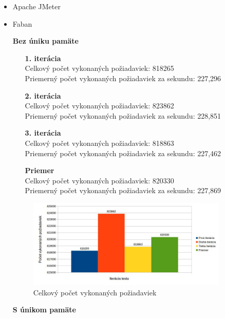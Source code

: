 \documentclass[12pt,oneside,final]{fithesis-utf8}
\begin{document}
\begin{itemize}

\item Apache JMeter

\item Faban

\textbf{Bez úniku pamäte}
\begin{itemize}

\item[\textbf{1. iterácia}]\ \\
Celkový počet vykonaných požiadaviek: 818265\\
Priemerný počet vykonaných požiadaviek za sekundu: 227,296

\item[\textbf{2. iterácia}]\ \\
Celkový počet vykonaných požiadaviek: 823862\\
Priemerný počet vykonaných požiadaviek za sekundu: 228,851

\item[\textbf{3. iterácia}]\ \\
Celkový počet vykonaných požiadaviek: 818863\\
Priemerný počet vykonaných požiadaviek za sekundu: 227,462

\item[\textbf{Priemer}]\ \\
Celkový počet vykonaných požiadaviek: 820330\\
Priemerný počet vykonaných požiadaviek za sekundu: 227,869

\end{itemize}

\begin{figure}[H]
  \centering
      \includegraphics[width=0.9\textwidth]{faban6_no_leak.jpg}
  \caption{Celkový počet vykonaných požiadaviek}
\end{figure}

\textbf{S únikom pamäte}
\begin{itemize}


\end{itemize}
\end{itemize}
\end{document}
